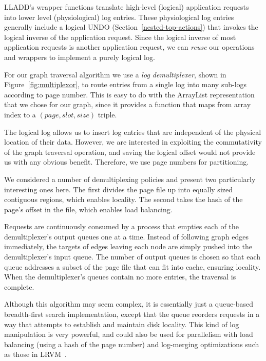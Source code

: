 \documentclass[10pt,letterpaper,twocolumn,english]{article}
\newcommand{\yad}{LLADD\xspace}
\begin{document}
\yad's wrapper functions translate high-level (logical) application
requests into lower level (physiological) log entries.  These
physiological log entries generally include a logical UNDO
(Section~\ref{nested-top-actions}) that invokes the logical
inverse of the application request.  Since the logical inverse of most
application requests is another application request, we can {\em reuse} our
operations and wrappers to implement a purely logical log.

For our graph traversal algorithm we use a {\em log demultiplexer},
shown in Figure~\ref{fig:multiplexor}, to route entries from a single
log into many sub-logs according to page number.  This is easy to do
with the ArrayList representation that we chose for our graph, since
it provides a function that maps from
array index to a $(page, slot, size)$ triple.

The logical log allows us to insert log entries that are independent
of the physical location of their data.  However, we are
interested in exploiting the commutativity of the graph traversal
operation, and saving the logical offset would not provide us with any
obvious benefit.  Therefore, we use page numbers for partitioning.

We considered a number of demultiplexing policies and present two
particularly interesting ones here.  The first divides the page file
up into equally sized contiguous regions, which enables locality.  The second takes the hash
of the page's offset in the file, which enables load balancing.

Requests are continuously consumed by a process that empties each of
the demultiplexer's output queues one at a time.  Instead of following
graph edges immediately, the targets of edges leaving each node are
simply pushed into the demultiplexer's input queue.  The number of
 output queues is chosen so that each queue addresses a
subset of the page file that can fit into cache, ensuring locality.  When the
demultiplexer's queues contain no more entries, the traversal is
complete.  

Although this algorithm may seem complex, it is essentially just a
queue-based breadth-first search implementation, except that the queue
reorders requests in a way that attempts to establish and maintain
disk locality.  This kind of log manipulation is very powerful, and
could also be used for parallelism with load balancing (using a hash
of the page number) and log-merging optimizations such as those in
LRVM~\cite{lrvm}.
\end{document}
